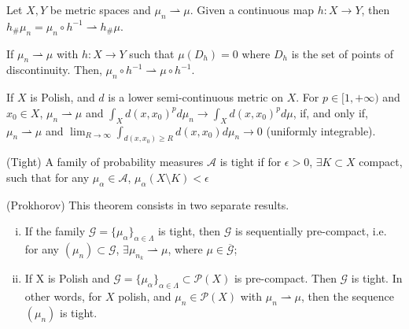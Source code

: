 \begin{theorem}
	Let $X,Y$ be metric spaces and $\mu_n \rightharpoonup \mu$.
	Given a continuous map $h:X\to Y$, then
	$h_\# \mu_n = \mu_n \circ h^{-1} \rightharpoonup h_\# \mu$.
\end{theorem}

\begin{corollary}
	If $\mu_n \rightharpoonup \mu$ with $h:X\to Y$ such that
	$\mu(D_h) = 0$ where $D_h$ is the set of points of discontinuity.
	Then, $\mu_n \circ h^{-1}\rightharpoonup \mu \circ h^{-1}$.
\end{corollary}

\begin{proposition}
	If $X$ is Polish, and $d$ is a lower semi-continuous metric on $X$. For $p \in [1,+\infty)$ and $x_0 \in X$,
	$\mu_n \rightharpoonup \mu$ and $\int_X d(x,x_0)^p d\mu_n \to \int_X d(x,x_0)^p d \mu$, if, and only if,
	$\mu_n \rightharpoonup \mu$ and $\lim_{R \to \infty} \int_{d(x,x_0)\geq R} d(x,x_0) d\mu_n \to 0$ (uniformly integrable).
\end{proposition}

\begin{definition} (Tight)
	A family of probability measures $\mathcal{A}$ is tight if for
	$\epsilon > 0$, $\exists K \subset X$ compact, such that for
	any $\mu_\alpha \in \mathcal{A}$,
	$\mu_\alpha (X \setminus K)<\epsilon$
	\label{def:tight}
\end{definition}

\begin{theorem}(Prokhorov) This theorem
	consists in two separate results.
	\label{Prokhorov}
	\begin{enumerate}[i)]
		\item If the family $\mathcal{G} =
			      \{\mu_\alpha\}_{\alpha \in \Lambda}$ is tight, then
		      $\mathcal{G}$ is sequentially pre-compact, i.e. for any
		      $(\mu_n) \subset \mathcal{G}$,
		      $\exists \mu_{n_k}\rightharpoonup \mu$, where
		      $\mu \in \overline{\mathcal{G}}$;

		\item If X is Polish and $\mathcal{G}=
			      \{\mu_\alpha\}_{\alpha \in \Lambda}\subset \mathcal{P}(X)$
		      is pre-compact. Then $\mathcal{G}$ is tight.
		      In other words, for $X$ polish, and $\mu_n \in \mathcal{P}(X)$
		      with $\mu_n \rightharpoonup \mu$, then the sequence
		      $(\mu_n)$ is tight.
	\end{enumerate}
\end{theorem}

